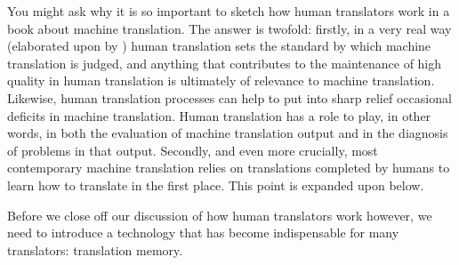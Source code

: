 \documentclass[output=paper]{langscibook}
\begin{document}
You might ask why it is so important to sketch how human translators work in a book about machine translation. The answer is twofold: firstly, in a very real way (elaborated upon by ) human translation sets the standard by which machine translation is judged, and anything that contributes to the maintenance of high quality in human translation is ultimately of relevance to machine translation. Likewise, human translation processes can help to put into sharp relief occasional deficits in machine translation. Human translation has a role to play, in other words, in both the evaluation of machine translation output and in the diagnosis of problems in that output. Secondly, and even more crucially, most contemporary machine translation relies on translations completed by humans to learn how to translate in the first place. This point is expanded upon below.

Before we close off our discussion of how human translators work however, we need to introduce a technology that has become indispensable for many translators: translation memory.
\end{document}
